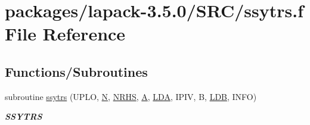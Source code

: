 \hypertarget{ssytrs_8f}{}\section{packages/lapack-\/3.5.0/\+S\+R\+C/ssytrs.f File Reference}
\label{ssytrs_8f}
\subsection*{Functions/\+Subroutines}
\begin{DoxyCompactItemize}
\item 
subroutine \hyperlink{group__realSYcomputational_gae20133a1119b69a7319783ff982c8c62}{ssytrs} (U\+P\+L\+O, \hyperlink{polmisc_8c_a0240ac851181b84ac374872dc5434ee4}{N}, \hyperlink{example__user_8c_aa0138da002ce2a90360df2f521eb3198}{N\+R\+H\+S}, \hyperlink{classA}{A}, \hyperlink{example__user_8c_ae946da542ce0db94dced19b2ecefd1aa}{L\+D\+A}, I\+P\+I\+V, B, \hyperlink{example__user_8c_a50e90a7104df172b5a89a06c47fcca04}{L\+D\+B}, I\+N\+F\+O)
\begin{DoxyCompactList}\small\item\em {\bfseries S\+S\+Y\+T\+R\+S} \end{DoxyCompactList}\end{DoxyCompactItemize}
